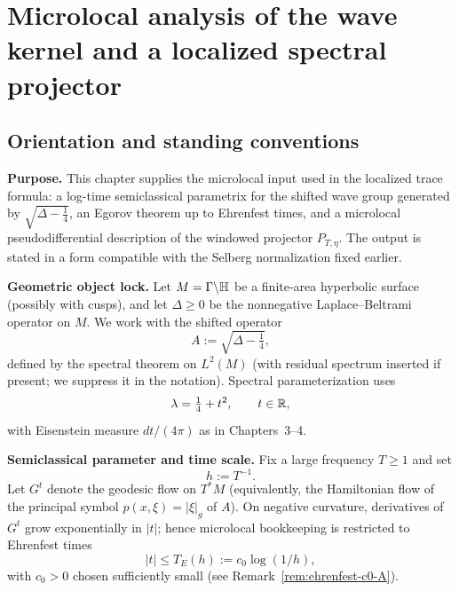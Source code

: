 
\chapter{Microlocal analysis of the wave kernel and a localized spectral projector}
\label{chap:microlocal-wave-projector}

\section*{Orientation and standing conventions}\label{sec:ch5-overview}

\noindent\textbf{Purpose.}
This chapter supplies the microlocal input used in the localized trace formula: a log-time semiclassical
parametrix for the shifted wave group generated by $\sqrt{\Delta-\tfrac14}$, an Egorov theorem up to
Ehrenfest times, and a microlocal pseudodifferential description of the windowed projector
$P_{T,\eta}$. The output is stated in a form compatible with the Selberg normalization fixed earlier.

\medskip
\noindent\textbf{Geometric object lock.}
Let $M=\Gamma\backslash\mathbb{H}$ be a finite-area hyperbolic surface (possibly with cusps), and let
$\Delta\ge 0$ be the nonnegative Laplace--Beltrami operator on $M$. We work with the shifted operator
\[
A:=\sqrt{\Delta-\tfrac14},
\]
defined by the spectral theorem on $L^2(M)$ (with residual spectrum inserted if present; we suppress it
in the notation). Spectral parameterization uses
\[
\lambda=\tfrac14+t^2,\qquad t\in\mathbb{R},
\]
with Eisenstein measure $dt/(4\pi)$ as in Chapters~3--4.

\medskip
\noindent\textbf{Semiclassical parameter and time scale.}
Fix a large frequency $T\ge 1$ and set
\[
h:=T^{-1}.
\]
Let $G^t$ denote the geodesic flow on $T^*M$ (equivalently, the Hamiltonian flow of the principal symbol
$p(x,\xi)=|\xi|_g$ of $A$). On negative curvature, derivatives of $G^t$ grow exponentially in $|t|$; hence
microlocal bookkeeping is restricted to Ehrenfest times
\begin{equation}\label{eq:ehrenfest-time-A}
|t|\le T_E(h):=c_0\log(1/h),
\end{equation}
with $c_0>0$ chosen sufficiently small (see Remark~\ref{rem:ehrenfest-c0-A}).

